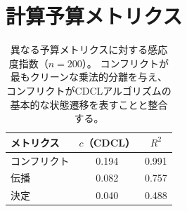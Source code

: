 \documentclass[11pt,a4paper]{article}
\begin{document}
\section{計算予算メトリクス}
\label{app:metrics}

\begin{table}[h]
\centering
\begin{tabular}{lcc}
\toprule
メトリクス & $c$（CDCL） & $R^2$ \\
\midrule
コンフリクト     & 0.194 & 0.991 \\
伝播  & 0.082 & 0.757 \\
決定     & 0.040 & 0.488 \\
\bottomrule
\end{tabular}
\caption{異なる予算メトリクスに対する感応度指数（$n = 200$）。
コンフリクトが最もクリーンな乗法的分離を与え、コンフリクトがCDCLアルゴリズムの基本的な状態遷移を表すことと整合する。}
\label{tab:metrics}
\end{table}
\end{document}
